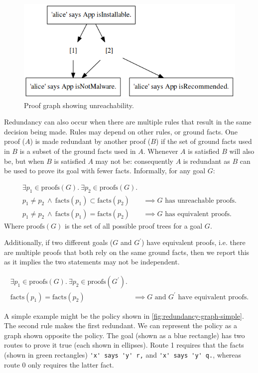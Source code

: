 \documentclass[thesis.tex]{subfiles}
\begin{document}
\begin{figure}
  \centering
  \includegraphics[width=0.5\linewidth]{./figures/unreachability.png}
  \caption{Proof graph showing unreachability.}
  \label{fig:unreachability}
\end{figure}

Redundancy can also occur when there are multiple rules that result in the
same decision being made.  Rules may depend on other rules, or ground
facts.  One proof ($A$) is made redundant by another proof ($B$) if
the set of ground facts used in $B$ is a subset of the ground facts
used in $A$. Whenever $A$ is satisfied $B$ will also be, but when $B$
is satisfied $A$ may not be: consequently $A$ is redundant as $B$ can
be used to prove its goal with fewer facts.  Informally, for any goal
$G$:

\begin{align*}
  \exists p_1 \in \text{proofs}(G).~\exists p_2 \in \text{proofs}(G).        & \\
  p_1 \not= p_2~\wedge~\text{facts}(p_1) \subset \text{facts}(p_2)           & \implies G\text{ has unreachable proofs.} \\
  p_1 \not= p_2~\wedge~\text{facts}(p_1) = \text{facts}(p_2)                 & \implies G\text{ has equivalent proofs.}
\end{align*}
Where $\text{proofs}(G)$ is the set of all possible proof trees for a goal $G$.

Additionally, if two different goals ($G$ and $G^\prime$) have
equivalent proofs, i.e. there are multiple proofs that both rely on the same ground facts, then we report this as it implies the two
statements may not be independent.

\begin{align*}
  \exists p_1 \in \text{proofs}(G).~\exists p_2 \in \text{proofs}(G^\prime). & \\
  \text{facts}(p_1) = \text{facts}(p_2)                                      & \implies \text{$G$ and $G^\prime$ have equivalent proofs.}
\end{align*}

A simple example might be the policy shown in \autoref{fig:redundancy-graph-simple}.
The second rule makes the first redundant.  We can represent the policy
as a graph shown opposite the policy.  The goal (shown as a blue rectangle) has two routes
to prove it true (each shown in ellipses).  Route 1 requires that the facts
(shown in green rectangles) \lstinline!'x' says 'y' r,! and
\lstinline!'x' says 'y' q.!, whereas route 0 only requires the
latter fact.
\end{document}
